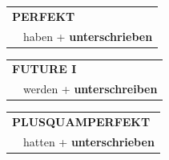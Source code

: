\documentclass[10pt,a4paper]{revtex4-2}
\begin{document}
\begin{verbbox-acc}
 \begin{tabular}{rl}
     \multicolumn{2}{l}{\textbf{PERFEKT}}\\
   & haben + \textbf{unterschrieben}\\
  \end{tabular}
\hfill
   \begin{tabular}{rl}
   
    \multicolumn{2}{l}{\textbf{FUTURE I} }\\
   & werden + \textbf{unterschreiben}\\
 
  \end{tabular}
\hfill
   \begin{tabular}{rl}
      \multicolumn{2}{l}{\textbf{PLUSQUAMPERFEKT}}\\
   & hatten + \textbf{unterschrieben}\\
  \end{tabular}
  
  \vspace{-5pt}


\end{verbbox-acc}
\end{document}
